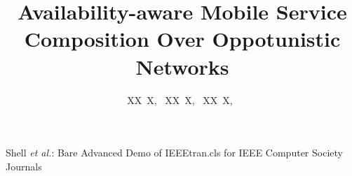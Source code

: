 \documentclass[10pt,journal,compsoc]{IEEEtran}
\begin{document}
\title{Availability-aware Mobile Service Composition Over Oppotunistic Networks}

\author{XX~X,~
		XX~X,~
        XX~X,~


}



%
{Shell \MakeLowercase{\textit{et al.}}: Bare Advanced Demo of IEEEtran.cls for IEEE Computer Society Journals}
\end{document}
